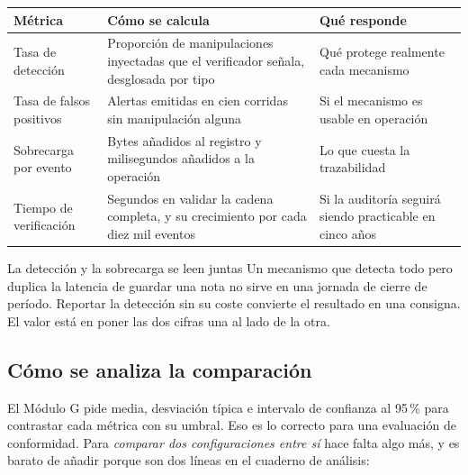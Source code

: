 \documentclass[11pt,a4paper]{article}
\begin{document}
\begin{center}
	\small
	\begin{tabular}{@{}p{4.2cm}p{6.2cm}p{4.6cm}@{}}
		\toprule
		\textbf{Métrica} & \textbf{Cómo se calcula} & \textbf{Qué responde} \\
		\midrule
		Tasa de detección & Proporción de manipulaciones inyectadas que el verificador señala, desglosada por tipo & Qué protege realmente cada mecanismo \\
		\addlinespace
		Tasa de falsos positivos & Alertas emitidas en cien corridas sin manipulación alguna & Si el mecanismo es usable en operación \\
		\addlinespace
		Sobrecarga por evento & Bytes añadidos al registro y milisegundos añadidos a la operación & Lo que cuesta la trazabilidad \\
		\addlinespace
		Tiempo de verificación & Segundos en validar la cadena completa, y su crecimiento por cada diez mil eventos & Si la auditoría seguirá siendo practicable en cinco años \\
		\bottomrule
	\end{tabular}
\end{center}

\begin{avisoBox}{La detección y la sobrecarga se leen juntas}
	Un mecanismo que detecta todo pero duplica la latencia de guardar una nota no sirve en una jornada de cierre de período. Reportar la detección sin su coste convierte el resultado en una consigna. El valor está en poner las dos cifras una al lado de la otra.
\end{avisoBox}

\subsection{Cómo se analiza la comparación}

El Módulo G pide media, desviación típica e intervalo de confianza al 95\,\% para contrastar cada métrica con su umbral. Eso es lo correcto para una evaluación de conformidad. Para \emph{comparar dos configuraciones entre sí} hace falta algo más, y es barato de añadir porque son dos líneas en el cuaderno de análisis:
\end{document}
